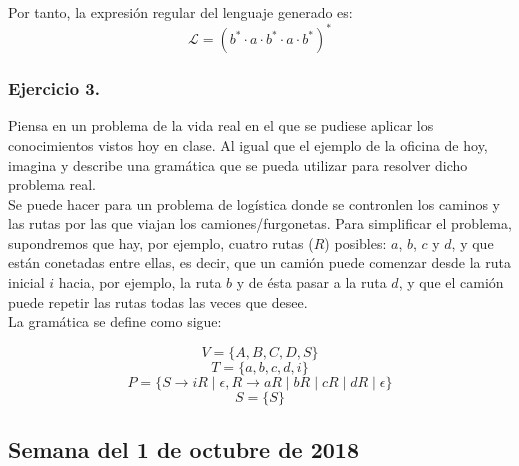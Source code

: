 \documentclass[11pt,a4paper]{article}
\begin{document}
Por tanto, la expresión regular del lenguaje generado es:
	\[\mathcal{L}=(b^*\cdot a\cdot b^*\cdot a\cdot b^*)^*\]
	
\subsubsection{Ejercicio 3.} Piensa en un problema de la vida real en el que se pudiese aplicar los conocimientos vistos hoy en clase. Al igual que el ejemplo de la oficina de hoy, imagina y describe una gramática que se pueda utilizar para resolver dicho problema real.\\

Se puede hacer para un problema de logística donde se contronlen los caminos y las rutas por las que viajan los camiones/furgonetas. Para simplificar el problema, supondremos que hay, por ejemplo, cuatro rutas ($R$) posibles: $a$, $b$, $c$ y $d$, y que están conetadas entre ellas, es decir, que un camión puede comenzar desde la ruta inicial $i$ hacia, por ejemplo, la ruta $b$ y de ésta pasar a la ruta $d$, y que el camión puede repetir las rutas todas las veces que desee.\\

La gramática se define como sigue:

\[V=\{A,B,C,D,S\}\]
\[T=\{a,b,c,d,i\}\]
\[P=\{S\rightarrow iR\mid \epsilon,R\rightarrow aR\mid bR\mid cR\mid dR\mid \epsilon\}\]
\[S=\{S\}\]

\subsection{Semana del 1 de octubre de 2018}
\end{document}

